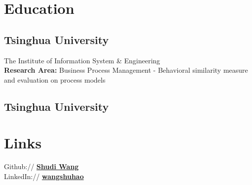 \documentclass[]{resume_en}
\begin{document}
%
%

%
%

%
%

\begin{minipage}[t]{0.33\textwidth} 


\section{Education} 

\subsection{Tsinghua University}
The Institute of Information System \& Engineering\\
{\bf Research Area:} Business Process Management - Behavioral similarity measure and evaluation on process models
\sectionsep

\subsection{Tsinghua University}
\sectionsep


\section{Links} 
Github:// \href{https://github.com/shudiwsh2009}{\bf Shudi Wang} \\
LinkedIn://  \href{https://cn.linkedin.com/in/wangshuhao}{\bf wangshuhao} \\
\sectionsep


\end{minipage}
\end{document}
